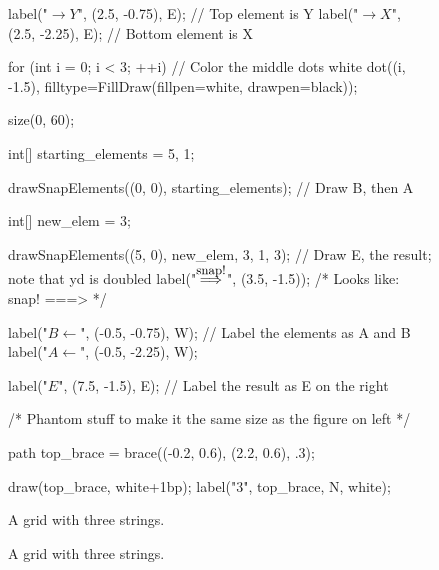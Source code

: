 \documentclass[../gatm.tex]{subfiles}
\begin{document}
\begin{figure}[h]
\begin{center}
\begin{minipage}[b]{0.45\textwidth}
\begin{asy}[width=0.3\textwidth]
				label("$\rightarrow Y$", (2.5, -0.75), E); // Top element is Y
				label("$\rightarrow X$", (2.5, -2.25), E); // Bottom element is X
	
				for (int i = 0; i < 3; ++i) // Color the middle dots white
					dot((i, -1.5), filltype=FillDraw(fillpen=white, drawpen=black));
			\end{asy}
		\end{minipage}
		\hfill
		\begin{minipage}[b]{0.45\textwidth}
			\centering
			\begin{asy}[width=0.7\textwidth]
				size(0, 60);
	
				int[] starting_elements = {5, 1};
	
				drawSnapElements((0, 0), starting_elements); // Draw B, then A
	
				int[] new_elem = {3};
	
				drawSnapElements((5, 0), new_elem, 3, 1, 3); // Draw E, the result; note that yd is doubled
				label("$\stackrel{\mbox{\small snap!}}{\Longrightarrow}$", (3.5, -1.5));
				/* Looks like:
				snap!
				===>  */
	
				label("$B \leftarrow$", (-0.5, -0.75), W); // Label the elements as A and B
				label("$A \leftarrow$", (-0.5, -2.25), W);
	
				label("$E$", (7.5, -1.5), E); // Label the result as E on the right
	
				/* Phantom stuff to make it the same size as the figure on left */
	
				path top_brace = brace((-0.2, 0.6), (2.2, 0.6), .3);
	
				draw(top_brace, white+1bp);
				label("$3$", top_brace, N, white);
			\end{asy}
		\end{minipage}
	\end{center}
	\vspace*{-2\baselineskip}
	\begin{center}
		\begin{minipage}[t]{0.45\textwidth}
			\caption{A grid with three strings.}
			\label{fig:n_rows_3_cols_ex}
		\end{minipage}
		\hfill
		\begin{minipage}[t]{0.45\textwidth}
			\caption{A grid with three strings.}
			\label{fig:snap_ex}
		\end{minipage}
	\end{center}
\end{figure}
\end{document}
